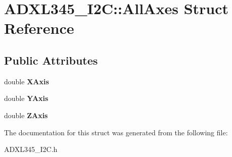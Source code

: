 \hypertarget{structADXL345__I2C_1_1AllAxes}{\section{\-A\-D\-X\-L345\-\_\-\-I2\-C\-:\-:\-All\-Axes \-Struct \-Reference}
\label{structADXL345__I2C_1_1AllAxes}
}
\subsection*{\-Public \-Attributes}
\begin{DoxyCompactItemize}
\item 
\hypertarget{structADXL345__I2C_1_1AllAxes_a924ade14b130a5a544182c239c515d8f}{double {\bfseries \-X\-Axis}}\label{structADXL345__I2C_1_1AllAxes_a924ade14b130a5a544182c239c515d8f}

\item 
\hypertarget{structADXL345__I2C_1_1AllAxes_a649604b9e35d13969b6e3f5b9a3cf914}{double {\bfseries \-Y\-Axis}}\label{structADXL345__I2C_1_1AllAxes_a649604b9e35d13969b6e3f5b9a3cf914}

\item 
\hypertarget{structADXL345__I2C_1_1AllAxes_ae8bdb3b8573e5edaf25ebae1b9cf89af}{double {\bfseries \-Z\-Axis}}\label{structADXL345__I2C_1_1AllAxes_ae8bdb3b8573e5edaf25ebae1b9cf89af}

\end{DoxyCompactItemize}


\-The documentation for this struct was generated from the following file\-:\begin{DoxyCompactItemize}
\item 
\-A\-D\-X\-L345\-\_\-\-I2\-C.\-h\end{DoxyCompactItemize}
